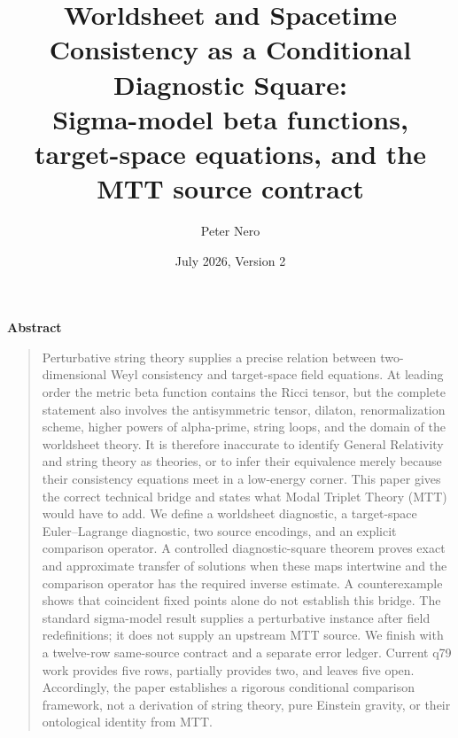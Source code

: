 \documentclass[11pt]{article}
\title{\textbf{Worldsheet and Spacetime Consistency as a Conditional Diagnostic Square:}\\
\large Sigma-model beta functions, target-space equations, and the MTT source contract}
\author{Peter Nero}
\date{July 2026, Version 2}
\renewenvironment{abstract}
  {\begin{center}\textbf{Abstract}\end{center}\begin{quote}\small}
  {\end{quote}}
\begin{document}
\maketitle

\begin{abstract}
Perturbative string theory supplies a precise relation between two-dimensional
Weyl consistency and target-space field equations.  At leading order the
metric beta function contains the Ricci tensor, but the complete statement
also involves the antisymmetric tensor, dilaton, renormalization scheme,
higher powers of alpha-prime, string loops, and the domain of the worldsheet
theory.  It is therefore inaccurate to identify General Relativity and string
theory as theories, or to infer their equivalence merely because their
consistency equations meet in a low-energy corner.  This paper gives the
correct technical bridge and states what Modal Triplet Theory (MTT) would
have to add.  We define a worldsheet diagnostic, a target-space
Euler--Lagrange diagnostic, two source encodings, and an explicit comparison
operator.  A controlled diagnostic-square theorem proves exact and
approximate transfer of solutions when these maps intertwine and the
comparison operator has the required inverse estimate.  A counterexample
shows that coincident fixed points alone do not establish this bridge.
The standard sigma-model result supplies a perturbative instance after field
redefinitions; it does not supply an upstream MTT source.  We finish with a
twelve-row same-source contract and a separate error ledger.  Current q79
work provides five rows, partially provides two, and leaves five open.
Accordingly, the paper establishes a rigorous conditional comparison
framework, not a derivation of string theory, pure Einstein gravity, or their
ontological identity from MTT.
\end{abstract}
\end{document}
